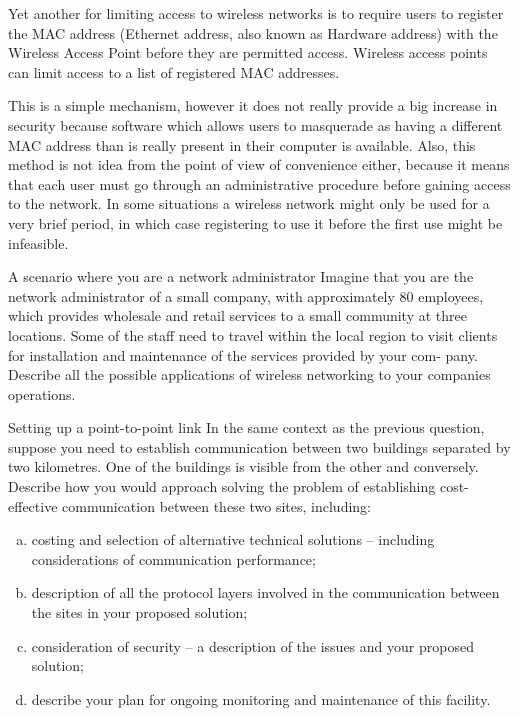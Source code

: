 Yet another for limiting access to wireless networks is to require users to register the MAC address (Ethernet address, also known as Hardware address) with the Wireless Access Point before they are permitted access. Wireless access points can limit access to a list of registered MAC addresses.

This is a simple mechanism, however it does not really provide a big increase in security because software which allows users to masquerade as having a different MAC address than is really present in their computer is available. Also, this method is not idea from the point of view of convenience either, because it means that each user must go through an administrative procedure before gaining access to the network. In some situations a wireless network might only be used for a very brief period, in which case registering to use it before the first use might be infeasible.

\begin{exercise}{A scenario where you are a network administrator}
Imagine that you are the network administrator of a small company, with
approximately 80 employees, which provides wholesale and retail services to a small
community at three locations. Some of the staff need to travel within the local region
to visit clients for installation and maintenance of the services provided by your com-
pany. Describe all the possible applications of wireless networking to your companies
operations.
\end{exercise}

\begin{exercise}{Setting up a point-to-point link}
In the same context as the previous question, suppose you need to establish 
communication between two buildings separated by two kilometres. One of the
buildings is visible from the other and conversely. Describe how you would approach
solving the problem of establishing cost-effective communication between these two
sites, including:
\begin{enumerate}[(a)]
\item costing and selection of alternative technical solutions – including considerations
of communication performance;
\item description of all the protocol layers involved in the communication between the
sites in your proposed solution;
\item consideration of security – a description of the issues and your proposed solution;
\item describe your plan for ongoing monitoring and maintenance of this facility.
\end{enumerate}
\end{exercise}

